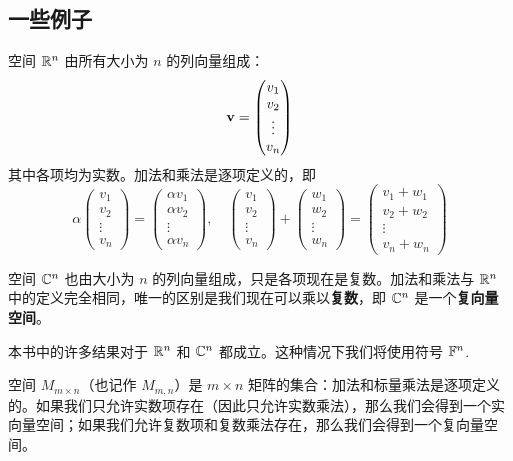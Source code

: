 \subsection{一些例子}\label{sec:01-01-01}
\begin{example*}
空间 $\mathbb{R}^n$ 由所有大小为 $n$ 的列向量组成：
$$
\mathbf{v} = \begin{pmatrix} v_1 \\ v_2 \\ \vdots \\ v_n \end{pmatrix}
$$
其中各项均为实数。加法和乘法是逐项定义的，即
$$
\alpha \begin{pmatrix} v_1 \\ v_2 \\ \vdots \\ v_n \end{pmatrix} = \begin{pmatrix} \alpha v_1 \\ \alpha v_2 \\ \vdots \\ \alpha v_n \end{pmatrix}, \quad \begin{pmatrix} v_1 \\ v_2 \\ \vdots \\ v_n \end{pmatrix} + \begin{pmatrix} w_1 \\ w_2 \\ \vdots \\ w_n \end{pmatrix} = \begin{pmatrix} v_1 + w_1 \\ v_2 + w_2 \\ \vdots \\ v_n + w_n \end{pmatrix}
$$
\end{example*}

\begin{example*}
空间 $\mathbb{C}^n$ 也由大小为 $n$ 的列向量组成，只是各项现在是复数。加法和乘法与 $\mathbb{R}^n$ 中的定义完全相同，唯一的区别是我们现在可以乘以\textbf{复数}，即 $\mathbb{C}^n$ 是一个\textbf{复向量空间}。
\end{example*}

本书中的许多结果对于 $\mathbb{R}^n$ 和 $\mathbb{C}^n$ 都成立。这种情况下我们将使用符号 $\mathbb{F}^n$.~



\begin{example*}
空间 $M_{m \times n}$（也记作 $M_{m,n}$）是 $m \times n$ 矩阵的集合：加法和标量乘法是逐项定义的。如果我们只允许实数项存在（因此只允许实数乘法），那么我们会得到一个实向量空间；如果我们允许复数项和复数乘法存在，那么我们会得到一个复向量空间。
\end{example*}

